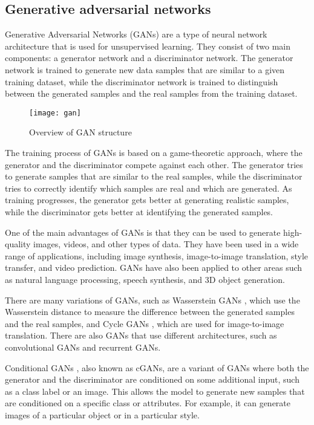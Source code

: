 \subsection{Generative adversarial networks}
Generative Adversarial Networks (GANs) \cite{goodfellow2014generative, mirza2014conditional} are a type of neural network architecture that is used for unsupervised learning.
They consist of two main components: a generator network and a discriminator network.
The generator network is trained to generate new data samples that are similar to a given training dataset, while the discriminator network is trained to distinguish between the generated samples and the real samples from the training dataset.

\begin{figure}[H]
  \centering
  \texttt{[image: gan]}
  \caption{Overview of GAN structure \cite{googledevelopers}}
\end{figure}

The training process of GANs is based on a game-theoretic approach, where the generator and the discriminator compete against each other.
The generator tries to generate samples that are similar to the real samples, while the discriminator tries to correctly identify which samples are real and which are generated.
As training progresses, the generator gets better at generating realistic samples, while the discriminator gets better at identifying the generated samples.

One of the main advantages of GANs is that they can be used to generate high-quality images, videos, and other types of data.
They have been used in a wide range of applications, including image synthesis, image-to-image translation, style transfer, and video prediction. 
GANs have also been applied to other areas such as natural language processing, speech synthesis, and 3D object generation.

There are many variations of GANs, such as Wasserstein GANs \cite{arxiv.1701.07875}, which use the Wasserstein distance to measure the difference between the generated samples and the real samples, and Cycle GANs \cite{CycleGAN2017}, which are used for image-to-image translation.
There are also GANs that use different architectures, such as convolutional GANs and recurrent GANs.

Conditional GANs \cite{arxiv.1411.1784}, also known as cGANs, are a variant of GANs where both the generator and the discriminator are conditioned on some additional input, such as a class label or an image.
This allows the model to generate new samples that are conditioned on a specific class or attributes.
For example, it can generate images of a particular object or in a particular style.

